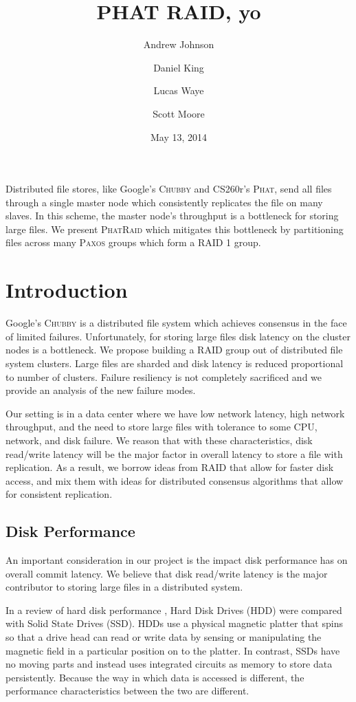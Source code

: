 \documentclass[10pt,letter]{article}
\newcommand{\chubby}[0]{\textsc{Chubby}}
\newcommand{\phat}[0]{\textsc{Phat}}
\newcommand{\phatraid}[0]{\textsc{PhatRaid}}
\newcommand{\raid}[1]{\textsc{RAID #1}}
\newcommand{\paxos}[0]{\textsc{Paxos}}
\begin{document}
\title{PHAT RAID, yo}
\author{Andrew Johnson \and Daniel King \and Lucas Waye \and Scott Moore}
\date{May 13, 2014}

\maketitle

Distributed file stores, like Google's \chubby{} and CS260r's \phat{}, send all
files through a single master node which consistently replicates the file on
many slaves. In this scheme, the master node's throughput is a bottleneck for
storing large files. We present \phatraid{} which mitigates this bottleneck by
partitioning files across many \paxos{} groups which form a \raid{1} group.

\section{Introduction}

Google's \chubby{}\cite{burrows-chubby} is a distributed file system which
achieves consensus in the face of limited failures. Unfortunately, for storing
large files disk latency on the cluster nodes is a bottleneck. We propose
building a RAID group out of distributed file system clusters. Large files are
sharded and disk latency is reduced proportional to number of clusters. Failure
resiliency is not completely sacrificed and we provide an analysis of the
new failure modes.

Our setting is in a data center where we have low network latency,
high network throughput, and the need to store large files with tolerance to
some CPU, network, and disk failure. We reason that with these characteristics,
disk read/write latency will be the major factor in overall latency to store a file
with replication. As a result, we borrow ideas from RAID that allow for faster
disk access, and mix them with ideas for distributed consensus algorithms that
allow for consistent replication.

\subsection{Disk Performance}

An important consideration in our project is the impact disk performance has on overall commit latency. We believe that disk read/write latency is the major contributor to storing large files in a distributed system.

In a review of hard disk performance \cite{disk-perf}, Hard Disk Drives (HDD) were compared with Solid State Drives (SSD). HDDs use a physical magnetic platter that spins so that a drive head can read or write data by sensing or manipulating the magnetic field in a particular position on to the platter. In contrast, SSDs have no moving parts and instead uses integrated circuits as memory to store data persistently. Because the way in which data is accessed is different, the performance characteristics between the two are different.
\end{document}
